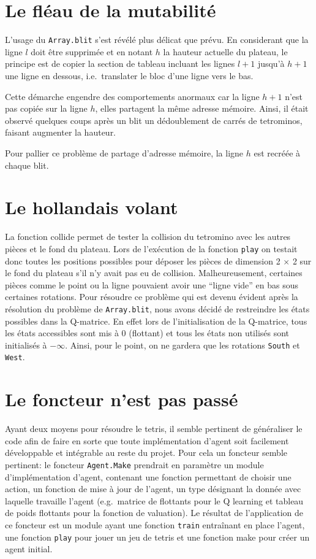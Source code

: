 \documentclass{report}
\begin{document}
\section{Le fléau de la mutabilité}
L'usage du \texttt{Array.blit} s'est révélé plus délicat que prévu. En
considerant que la ligne \(l\) doit être supprimée et en notant \(h\) la hauteur
actuelle du plateau, le principe est de copier la section de tableau incluant
les lignes \(l+1\) jusqu'à \(h+1\) une ligne en dessous, i.e.\ translater le
bloc d'une ligne vers le bas.

Cette démarche engendre des comportements anormaux car la ligne \(h+1\) n'est
pas copiée sur la ligne \(h\), elles partagent la même adresse mémoire. Ainsi,
il était observé quelques coups après un blit un dédoublement de carrés de
tetrominos, faisant augmenter la hauteur.

Pour pallier ce problème de partage d'adresse mémoire, la ligne \(h\) est
recréée à chaque blit.

\section{Le hollandais volant}\label{volant}
La fonction collide permet de tester la collision du tetromino avec les autres
pièces et le fond du plateau. Lors de l'exécution de la fonction \texttt{play}
on testait donc toutes les positions possibles pour déposer les pièces de
dimension 2 \(\times \) 2 sur le fond du plateau s'il n'y avait pas eu de
collision. Malheureusement, certaines pièces comme le point ou la ligne
pouvaient avoir une ``ligne vide'' en bas sous certaines rotations. Pour
résoudre ce problème qui est devenu évident après la résolution du problème de
\texttt{Array.blit}, nous avons décidé de restreindre les états possibles dans
la Q-matrice. En effet lors de l'initialisation de la Q-matrice, tous les états
accessibles sont mis à 0 (flottant) et tous les états non utilisés sont
initialisés à \(-\infty \). Ainsi, pour le point, on ne gardera que les
rotations \texttt{South} et \texttt{West}.

\section{Le foncteur n'est pas passé}
Ayant deux moyens pour résoudre le tetris, il semble pertinent de
généraliser le code afin de faire en sorte que toute implémentation
d'agent soit facilement développable et intégrable au reste du projet. Pour
cela un foncteur semble pertinent: le foncteur \texttt{Agent.Make} prendrait en
paramètre un module d'implémentation d'agent, contenant une fonction
permettant de choisir une action, un fonction de mise \`a jour de l'agent, un
type d\'esignant la donnée avec laquelle travaille l'agent (e.g.\ matrice de
flottants pour le Q learning et tableau de poids flottants pour la fonction de
valuation). Le r\'esultat de l'application de ce foncteur est un module ayant
une fonction \texttt{train} entra\^inant en place l'agent, une fonction
\texttt{play} pour jouer un jeu de tetris et une fonction make pour cr\'eer un
agent initial.
\end{document}
